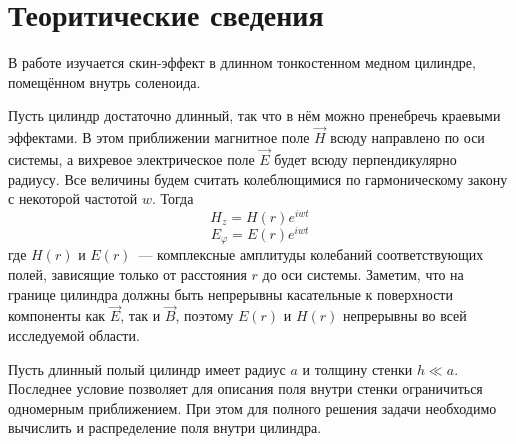 \section{Теоритические сведения}
\begin{figure}[ht!]
\end{figure}
В работе изучается скин-эффект в длинном тонкостенном медном цилиндре, помещённом внутрь соленоида.

Пусть цилиндр достаточно длинный, так что в нём можно пренебречь краевыми эффектами. В
этом приближении магнитное поле $\vec{H}$ всюду направлено по оси системы,
а вихревое электрическое поле $\vec{E}$  будет всюду перпендикулярно радиусу.
Все величины будем считать колеблющимися по гармоническому закону с некоторой частотой
$w$. Тогда
\[
    H_{z} = H(r)e^{iwt}
\]
\[
    E_{ \varphi} = E(r)e^{iwt}
\]
где $H(r)$ и $E(r)$~--- комплексные амплитуды колебаний соответствующих полей, зависящие только от
расстояния $r$ до оси системы. Заметим, что на границе цилиндра должны быть непрерывны касательные
к поверхности компоненты как $\vec{E}$, так и $\vec{B}$, поэтому $E(r)$ и $H(r)$ непрерывны во всей исследуемой области.

Пусть длинный полый цилиндр имеет радиус $a$ и толщину стенки $h \ll a$.
Последнее условие позволяет для описания поля внутри стенки ограничиться одномерным приближением.
При этом для полного решения задачи необходимо вычислить и распределение
поля внутри цилиндра.

